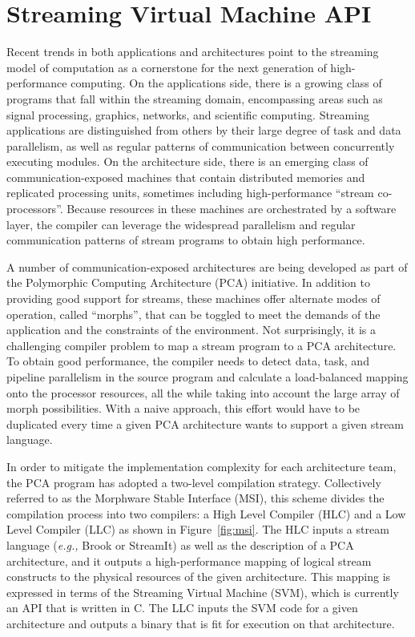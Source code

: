 \section{Streaming Virtual Machine API}

Recent trends in both applications and architectures point to the
streaming model of computation as a cornerstone for the next
generation of high-performance computing.  On the applications side,
there is a growing class of programs that fall within the streaming
domain, encompassing areas such as signal processing, graphics,
networks, and scientific computing.  Streaming applications are
distinguished from others by their large degree of task and data
parallelism, as well as regular patterns of communication between
concurrently executing modules.  On the architecture side, there is an
emerging class of communication-exposed machines that contain
distributed memories and replicated processing units, sometimes
including high-performance ``stream co-processors''.  Because
resources in these machines are orchestrated by a software layer, the
compiler can leverage the widespread parallelism and regular
communication patterns of stream programs to obtain high performance.

A number of communication-exposed architectures are being developed as
part of the Polymorphic Computing Architecture (PCA) initiative.  In
addition to providing good support for streams, these machines offer
alternate modes of operation, called ``morphs'', that can be toggled to
meet the demands of the application and the constraints of the
environment.  Not surprisingly, it is a challenging compiler problem
to map a stream program to a PCA architecture.  To obtain good
performance, the compiler needs to detect data, task, and pipeline
parallelism in the source program and calculate a load-balanced
mapping onto the processor resources, all the while taking into
account the large array of morph possibilities.  With a naive
approach, this effort would have to be duplicated every time a given
PCA architecture wants to support a given stream language.

In order to mitigate the implementation complexity for each
architecture team, the PCA program has adopted a two-level compilation
strategy.  Collectively referred to as the Morphware Stable Interface
(MSI), this scheme divides the compilation process into two compilers:
a High Level Compiler (HLC) and a Low Level Compiler (LLC) as shown in
Figure~\ref{fig:msi}.  The HLC inputs a stream language ({\it e.g.,}
Brook or StreamIt) as well as the description of a PCA architecture,
and it outputs a high-performance mapping of logical stream constructs
to the physical resources of the given architecture.  This mapping is
expressed in terms of the Streaming Virtual Machine (SVM), which is
currently an API that is written in C.  The LLC inputs the SVM code
for a given architecture and outputs a binary that is fit for
execution on that architecture.


